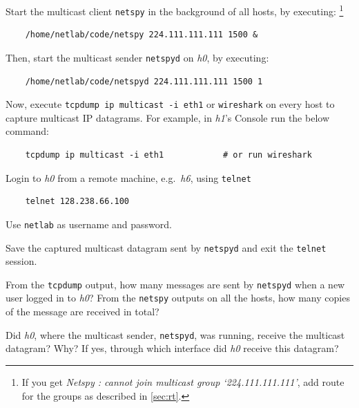 \documentclass{UTNetLab}
\begin{document}
    Start the multicast client \lstinline{netspy} in the background of all hosts, by executing:%
    \footnote{If you get \textit{Netspy : cannot join multicast group `224.111.111.111'}, add route for the groups as described in \autoref{sec:rt}.}

    \begin{lstlisting}
	/home/netlab/code/netspy 224.111.111.111 1500 &
    \end{lstlisting}
    
    Then, start the multicast sender \lstinline{netspyd} on \textit{h0}, by executing:

    \begin{lstlisting}
	/home/netlab/code/netspyd 224.111.111.111 1500 1
    \end{lstlisting}
    
    Now, execute \lstinline{tcpdump ip multicast -i eth1} or \lstinline{wireshark} on every host to capture multicast IP datagrams. For example, in \textit{h1}'s Console run the below command:

\begin{lstlisting}
	tcpdump ip multicast -i eth1			# or run wireshark
\end{lstlisting}


Login to \textit{h0} from a remote machine, e.g.\ \textit{h6}, using \lstinline{telnet}

    \begin{lstlisting}
	telnet 128.238.66.100
    \end{lstlisting}
    Use \texttt{netlab} as username and password.

    Save the captured multicast datagram sent by \lstinline{netspyd} and exit the \lstinline{telnet} session.

    \begin{report}
        \item From the \lstinline{tcpdump} output, how many messages are sent by \lstinline{netspyd} when a new user logged in to \textit{h0}?
            From the \lstinline{netspy} outputs on all the hosts, how many copies of the message are received in total?

        \item Did \textit{h0}, where the multicast sender, \lstinline{netspyd}, was running, receive the multicast datagram?
            Why?
            If yes, through which interface did \textit{h0} receive this datagram?
    \end{report}
\end{document}
